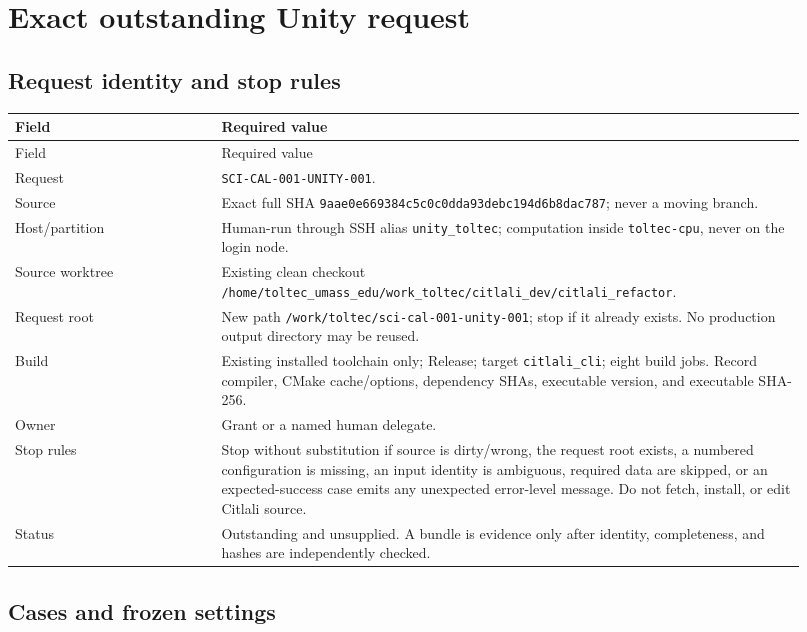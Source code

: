 \documentclass[11pt]{article}
\newcommand{\code}[1]{\nolinkurl{#1}}
\begin{document}
\section{Exact outstanding Unity request}
\label{app:unity}

\subsection*{Request identity and stop rules}

\begin{longtable}{L{0.24\linewidth}L{0.68\linewidth}}
\toprule
Field & Required value\\
\midrule
\endfirsthead
\toprule
Field & Required value\\
\midrule
\endhead
Request & \code{SCI-CAL-001-UNITY-001}.\\
Source & Exact full SHA
\code{9aae0e669384c5c0c0dda93debc194d6b8dac787}; never a moving branch.\\
Host/partition & Human-run through SSH alias \code{unity_toltec}; computation
inside \code{toltec-cpu}, never on the login node.\\
Source worktree & Existing clean checkout
\code{/home/toltec_umass_edu/work_toltec/citlali_dev/citlali_refactor}.\\
Request root & New path \code{/work/toltec/sci-cal-001-unity-001}; stop if it
already exists.  No production output directory may be reused.\\
Build & Existing installed toolchain only; Release; target
\code{citlali_cli}; eight build jobs.  Record compiler, CMake cache/options,
dependency SHAs, executable version, and executable SHA-256.\\
Owner & Grant or a named human delegate.\\
Stop rules & Stop without substitution if source is dirty/wrong, the request
root exists, a numbered configuration is missing, an input identity is
ambiguous, required data are skipped, or an expected-success case emits any
unexpected error-level message.  Do not fetch, install, or edit Citlali
source.\\
Status & Outstanding and unsupplied.  A bundle is evidence only after identity,
completeness, and hashes are independently checked.\\
\bottomrule
\end{longtable}

\subsection*{Cases and frozen settings}
\end{document}
